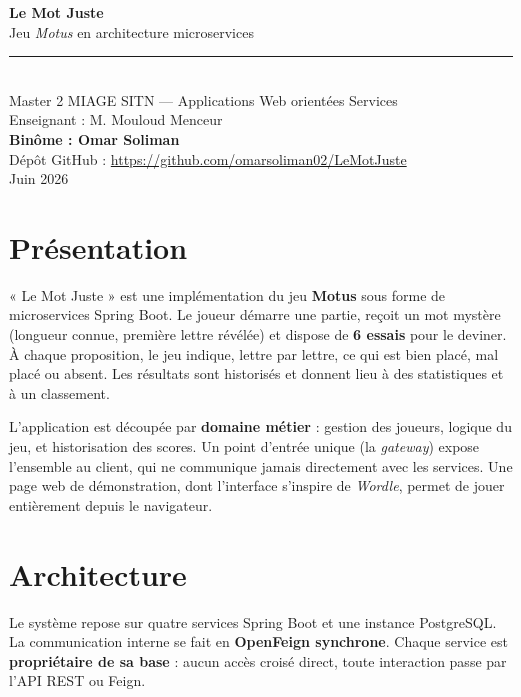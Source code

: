 \documentclass[11pt,a4paper]{article}
\begin{document}
\begin{center}
  {\LARGE\bfseries Le Mot Juste}\\[2pt]
  {\large Jeu \textit{Motus} en architecture microservices}\\[6pt]
  {\color{accent}\rule{0.5\linewidth}{1pt}}\\[8pt]
  {\normalsize Master 2 MIAGE SITN — Applications Web orientées Services}\\[2pt]
  {\normalsize Enseignant : M. Mouloud Menceur}\\[8pt]
  {\large\bfseries Binôme : Omar Soliman \quad\textbullet{}}\\[4pt]
  {\small Dépôt GitHub : \url{https://github.com/omarsoliman02/LeMotJuste}}\\[2pt]
  {\small Juin 2026}
\end{center}
\vspace{4pt}

\section{Présentation}
« Le Mot Juste » est une implémentation du jeu \textbf{Motus} sous forme de
microservices Spring Boot. Le joueur démarre une partie, reçoit un mot mystère
(longueur connue, première lettre révélée) et dispose de \textbf{6 essais} pour le
deviner. À chaque proposition, le jeu indique, lettre par lettre, ce qui est bien
placé, mal placé ou absent. Les résultats sont historisés et donnent lieu à des
statistiques et à un classement.

L'application est découpée par \textbf{domaine métier} : gestion des joueurs, logique
du jeu, et historisation des scores. Un point d'entrée unique (la \textit{gateway})
expose l'ensemble au client, qui ne communique jamais directement avec les services.
Une page web de démonstration, dont l'interface s'inspire de \textit{Wordle}, permet
de jouer entièrement depuis le navigateur.

\section{Architecture}
Le système repose sur quatre services Spring Boot et une instance PostgreSQL. La
communication interne se fait en \textbf{OpenFeign synchrone}. Chaque service est
\textbf{propriétaire de sa base} : aucun accès croisé direct, toute interaction passe
par l'API REST ou Feign.
\end{document}
